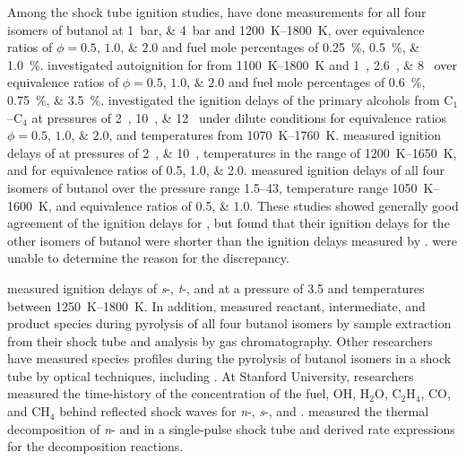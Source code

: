 \documentclass[../main.tex]{subfiles}
\begin{document}
Among the shock tube ignition studies, \textcite{Moss2008} have done
measurements for all four isomers of butanol at \SIlist{1;4}{\bar} and
\SIrange{1200}{1800}{\kelvin}, over equivalence ratios of $\phi = \numlist{0.5;1.0;2.0}$
and fuel mole percentages of \SIlist{0.25;0.5;1.0}{\percent}.
\textcite{Black2010} investigated autoignition for \nBuOH{} from
\SIrange{1100}{1800}{\kelvin} and \SIlist{1;2.6;8}{\atmosphere} over equivalence ratios of
$\phi = \numlist{0.5;1.0;2.0}$ and fuel mole percentages of \SIlist{0.6;0.75;3.5}{\percent}.
\textcite{Noorani2010} investigated the ignition delays of the primary alcohols
from C$_1$--C$_4$ at pressures of \SIlist{2;10;12}{\atmosphere} under dilute
conditions for equivalence ratios $\phi = \numlist{0.5;1.0;2.0}$, and temperatures
from \SIrange{1070}{1760}{\kelvin}. \textcite{Zhang2012} measured ignition
delays of \nBuOH{} at pressures of \SIlist{2;10}{\atmosphere},
temperatures in the range of \SIrange{1200}{1650}{\kelvin}, and for equivalence
ratios of \numlist{0,5;1.0;2.0}. \textcite{Stranic2012} measured ignition
delays of all four isomers of butanol over the pressure range \SIrange{1.5}{43}{\atmosphere},
temperature range \SIrange{1050}{1600}{\kelvin}, and equivalence ratios of
\numlist{0.5;1.0}. These studies showed generally good agreement of
the ignition delays for \nBuOH{}, but \textcite{Stranic2012}
found that their ignition delays for the other isomers of butanol were
shorter than the ignition delays measured by \textcite{Moss2008}.
\textcite{Stranic2012} were unable to determine the reason for the
discrepancy.

\textcite{Yasunaga2012} measured ignition delays of \textit{s}-,
\textit{t}-, and \iBuOH{} at a pressure of \SI{3.5}{\atmosphere}
and temperatures between \SIrange{1250}{1800}{\kelvin}. In addition,
\textcite{Yasunaga2012} measured reactant, intermediate, and product
species during pyrolysis of all four butanol isomers by sample extraction
from their shock tube and analysis by gas chromatography. Other researchers
have measured species profiles during the pyrolysis of butanol isomers
in a shock tube by optical techniques, including \textcite{Cook2012, Stranic2012a, Stranic2013,
Rosado-Reyes2012a, Rosado-Reyes2012}. At Stanford University, researchers
measured the time-history of the concentration of the fuel, OH, H$_2$O, C$_2$H$_4$, CO, and CH$_4$
behind reflected shock waves for \textit{n}-, \textit{s}-,
and \iBuOH{} \cite{Cook2012, Stranic2012a, Stranic2013}.
\textcite{Rosado-Reyes2012a, Rosado-Reyes2012} measured the thermal
decomposition of \textit{n}- and \sBuOH{} in a
single-pulse shock tube and derived rate expressions for the decomposition
reactions.
\end{document}
